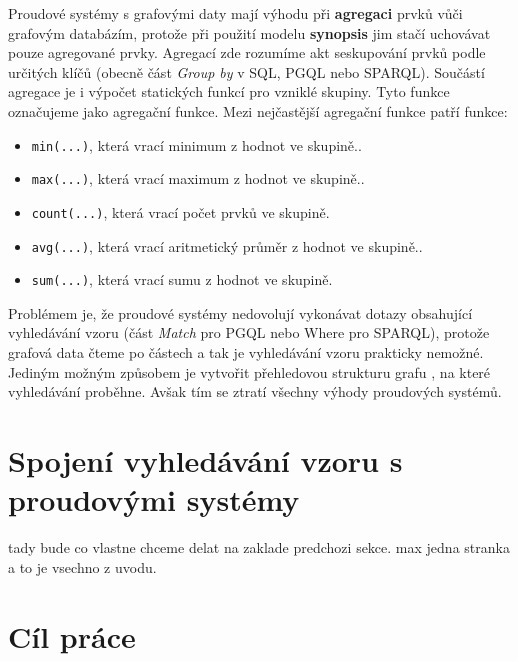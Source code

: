 Proudové systémy s grafovými daty mají výhodu při \textbf{agregaci} prvků vůči grafovým databázím, protože při použití modelu \textbf{synopsis} jim stačí uchovávat pouze agregované prvky. 
Agregací zde rozumíme akt seskupování prvků podle určitých klíčů (obecně část \textit{Group by} v SQL, PGQL nebo SPARQL).
Součástí agregace je i výpočet statických funkcí pro vzniklé skupiny.
Tyto funkce označujeme jako agregační funkce.
Mezi nejčastější agregační funkce patří funkce:
\begin{itemize} 
\item \texttt{min(...)}, která vrací minimum z hodnot ve skupině..
\item \texttt{max(...)}, která vrací maximum z hodnot ve skupině..
\item \texttt{count(...)}, která vrací počet prvků ve skupině.
\item \texttt{avg(...)}, která vrací aritmetický průměr z hodnot ve skupině..
\item \texttt{sum(...)}, která vrací sumu z hodnot ve skupině.
\end{itemize}
Problémem je, že proudové systémy nedovolují vykonávat dotazy obsahující vyhledávání vzoru (část \textit{Match} pro PGQL nebo Where pro SPARQL), protože grafová data čteme po částech a tak je vyhledávání vzoru prakticky nemožné.
Jediným možným způsobem je vytvořit přehledovou strukturu grafu \citep{graphsummary}, na které vyhledávání proběhne.
Avšak tím se ztratí všechny výhody proudových systémů.

\section*{Spojení vyhledávání vzoru s proudovými systémy}

tady bude co vlastne chceme delat na zaklade predchozi sekce.
max jedna stranka a to je vsechno z uvodu.

\clearpage
\section*{Cíl práce}

